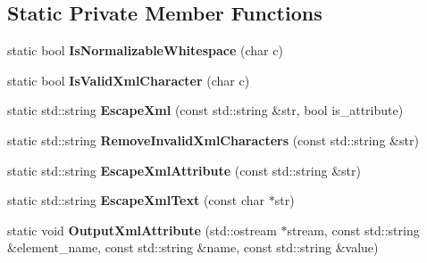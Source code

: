 \subsection*{Static Private Member Functions}
\begin{DoxyCompactItemize}
\item 
\mbox{\label{classtesting_1_1internal_1_1_xml_unit_test_result_printer_af9d5af6e5d0c505d5c3bd50a8d2a8d76}} 
static bool {\bfseries Is\+Normalizable\+Whitespace} (char c)
\item 
\mbox{\label{classtesting_1_1internal_1_1_xml_unit_test_result_printer_a2b83a24e3ec8544efa1156f9d6e51873}} 
static bool {\bfseries Is\+Valid\+Xml\+Character} (char c)
\item 
\mbox{\label{classtesting_1_1internal_1_1_xml_unit_test_result_printer_adadf42cf46ade9b26743466ce4b52f36}} 
static std\+::string {\bfseries Escape\+Xml} (const std\+::string \&str, bool is\+\_\+attribute)
\item 
\mbox{\label{classtesting_1_1internal_1_1_xml_unit_test_result_printer_aa14cb72f42a346841482cbafa65e3155}} 
static std\+::string {\bfseries Remove\+Invalid\+Xml\+Characters} (const std\+::string \&str)
\item 
\mbox{\label{classtesting_1_1internal_1_1_xml_unit_test_result_printer_aad574d7bb0c24578d5acc57817b9d367}} 
static std\+::string {\bfseries Escape\+Xml\+Attribute} (const std\+::string \&str)
\item 
\mbox{\label{classtesting_1_1internal_1_1_xml_unit_test_result_printer_a934486bda28e7013f2d07520d5098a31}} 
static std\+::string {\bfseries Escape\+Xml\+Text} (const char $\ast$str)
\item 
\mbox{\label{classtesting_1_1internal_1_1_xml_unit_test_result_printer_aa8ca7066de948d26d171597430c75839}} 
static void {\bfseries Output\+Xml\+Attribute} (std\+::ostream $\ast$stream, const std\+::string \&element\+\_\+name, const std\+::string \&name, const std\+::string \&value)

\end{DoxyCompactItemize}
